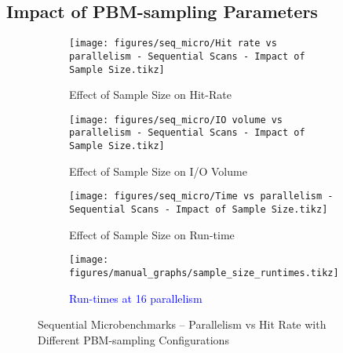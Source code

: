 \subsection{Impact of PBM-sampling Parameters}
\label{sec:eval_sample_size}


\begin{figure}
\centering
    \begin{subfigure}{0.45\textwidth}
        \centering
        \texttt{[image: figures/seq\_micro/Hit rate vs parallelism - Sequential Scans - Impact of Sample Size.tikz]}
        \caption{Effect of Sample Size on Hit-Rate}
        \label{fig:seq_micro_parallel_hitrate_samplesize}
    \end{subfigure}\hspace{0.05\textwidth}%
    \begin{subfigure}{0.45\textwidth}
        \centering
        \texttt{[image: figures/seq\_micro/IO volume vs parallelism - Sequential Scans - Impact of Sample Size.tikz]}
        \caption{Effect of Sample Size on I/O Volume}
        \label{fig:seq_micro_parallel_iovol_samplesize}
    \end{subfigure}
    
\vspace{20pt}
    \begin{subfigure}{0.45\textwidth}
        \centering
        \texttt{[image: figures/seq\_micro/Time vs parallelism - Sequential Scans - Impact of Sample Size.tikz]}
        \caption{Effect of Sample Size on Run-time}
        \label{fig:seq_micro_parallel_time_samplesize}
    \end{subfigure}\hspace{0.05\textwidth}%
    \begin{subfigure}{0.45\textwidth}
        \centering
        \texttt{[image: figures/manual\_graphs/sample\_size\_runtimes.tikz]}
        \caption{\textcolor{blue}{Run-times at 16 parallelism}}
        \label{fig:seq_micro_bar_samplesize}
    \end{subfigure}
    \caption{Sequential Microbenchmarks -- Parallelism vs Hit Rate with Different PBM-sampling Configurations}
    \label{fig:seq_micro_parallel_samplingparams}
\end{figure}


